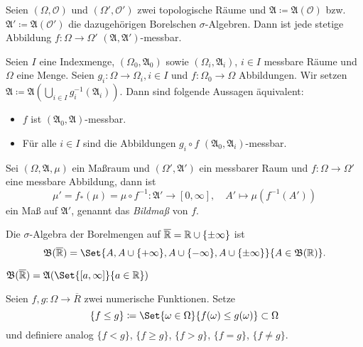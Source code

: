 \documentclass{cheat-sheet}
\newcommand{\ER}{\overline\R} %
\newcommand{\Alg}{\mathfrak{A}}
\newcommand{\Bor}{\mathfrak{B}} %
\begin{document}
\begin{satz}
  Seien $(\Omega, \mathcal{O})$ und $(\Omega', \mathcal{O}')$ zwei topologische Räume und $\Alg \coloneqq \Alg(\mathcal{O})$ bzw. $\Alg' \coloneqq \Alg(\mathcal{O}')$ die dazugehörigen Borelschen $\sigma$-Algebren. Dann ist jede stetige Abbildung $f : \Omega \to \Omega'$ $(\Alg, \Alg')$-messbar.
\end{satz}


\begin{satz}[Projektionssatz]
  Seien $I$ eine Indexmenge, $(\Omega_0, \Alg_0)$ sowie $(\Omega_i, \Alg_i)$, $i \in I$ messbare Räume und $\Omega$ eine Menge. Seien $g_i : \Omega \to \Omega_i, i \in I$ und $f : \Omega_0 \to \Omega$ Abbildungen. Wir setzen $\Alg \coloneqq \Alg\left( \bigcup_{i \in I} g_i^{-1}(\Alg_i) \right)$. Dann sind folgende Aussagen äquivalent:
  \begin{itemize}
    \item $f$ ist $(\Alg_0, \Alg)$-messbar.
    \item Für alle $i \in I$ sind die Abbildungen $g_i \circ f$ $(\Alg_0, \Alg_i)$-messbar.
  \end{itemize}
\end{satz}

\begin{satz}
  Sei $(\Omega, \Alg, \mu)$ ein Maßraum und $(\Omega', \Alg')$ ein messbarer Raum und $f : \Omega \to \Omega'$ eine messbare Abbildung, dann ist
  \[ \mu' = f_*(\mu) = \mu \circ f^{-1} : \Alg' \to [0, \infty], \quad A' \mapsto \mu(f^{-1}(A')) \]
  ein Maß auf $\Alg'$, genannt das \emph{Bildmaß} von $f$.
\end{satz}

\begin{defn}
  Die $\sigma$-Algebra der Borelmengen auf $\ER = \R \cup \{ \pm \infty \}$ ist
  \[ \Bor(\ER) = \Set{ A, A \cup \{ +\infty \}, A \cup \{ -\infty \}, A \cup \{ \pm \infty \} }{ A \in \Bor(\R) }. \]
\end{defn}

\begin{satz}
  $\Bor(\ER) = \Alg(\Set{ [a, \infty] }{ a \in \R })$
\end{satz}

\begin{nota}
  Seien $f, g : \Omega \to \overline{R}$ zwei numerische Funktionen. Setze
    \[ \{ f \leq g \} \coloneqq \Set{ \omega \in \Omega }{ f(\omega) \leq g(\omega) } \subset \Omega \]
  und definiere analog $\{ f < g \}$, $\{ f \geq g \}$, $\{ f > g \}$, $\{ f = g \}$, $\{ f \not= g \}$.
\end{nota}
\end{document}
